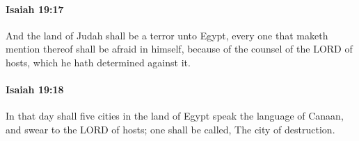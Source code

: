 		\paragraph{Isaiah 19:17} %
			\label{ISAIAH-19-17}

			And the land of Judah shall be a terror unto Egypt, every one that maketh mention thereof shall be afraid in himself, because of the counsel of the LORD of hosts, which he hath determined against it.


		\paragraph{Isaiah 19:18} %
			\label{ISAIAH-19-18}

			In that day shall five cities in the land of Egypt speak the language of Canaan, and swear to the LORD of hosts; one shall be called, The city of destruction.



